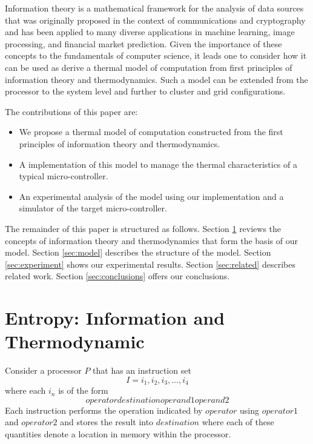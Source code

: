 \documentclass[times, 10pt,onecolumn]{article}
\begin{document}
Information theory is a mathematical framework for the analysis of data
sources that was originally proposed in the context of communications and
cryptography and has been applied to many diverse applications in machine
learning, image processing, and financial market prediction.   Given the
importance of these concepts to the fundamentals of computer science, it leads
one to consider how it can be used as derive a thermal model of computation
from first principles of information theory and thermodynamics.   Such a model
can be extended from the processor to the system level and further to cluster
and grid configurations.

The contributions of this paper are:
\begin{itemize}
\item We propose a thermal model of computation constructed from the first
  principles of information theory and thermodynamics.
\item A implementation of this model to manage the thermal characteristics of
  a typical micro-controller.
\item An experimental analysis of the model using our implementation and a
  simulator of the target micro-controller.
\end{itemize}

The remainder of this paper is structured as follows.  Section
\ref{sec:entropy} reviews the concepts of information theory and
thermodynamics that form the basis of our model.  Section
\ref{sec:model} describes the structure of the model.  Section
\ref{sec:experiment} shows our experimental results.  Section
\ref{sec:related} describes related work. Section \ref{sec:conclusions}
offers our conclusions.

\section{Entropy: Information and Thermodynamic}
\label{sec:entropy}
Consider a processor $P$ that has an instruction set
\begin{equation}
  \label{eq:instset}
  I = {i_{1},i_{2},i_{3},\ldots,i_{4}}
\end{equation}
where each $i_{n}$ is of the form
\begin{equation}
  \label{eq:instform}
  operator destination operand1 operand2
\end{equation}
Each instruction performs the operation indicated by $operator$ using
$operator1$ and $operator2$ and stores the result into $destination$
where each of these quantities denote a location in memory within the
processor. 
\end{document}
